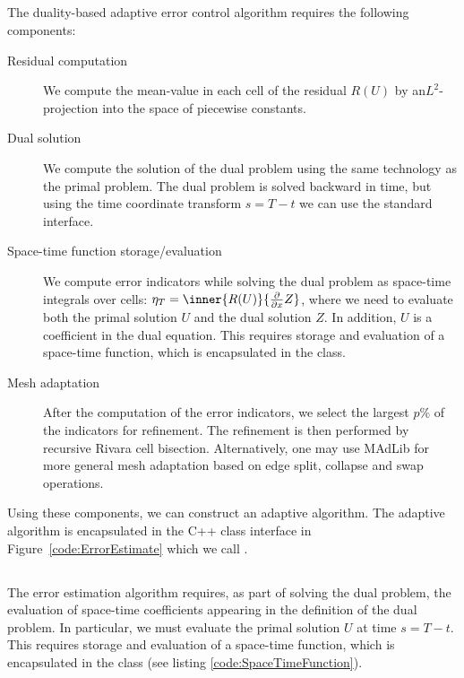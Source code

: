 \subsection{}

The duality-based adaptive error control algorithm requires the
following components:

\begin{description}
\item[Residual computation] We compute the mean-value in each cell of
  the residual $R(U)$ by an\break $L^2$-projection into the space of piecewise
  constants.
\item[Dual solution] We compute the solution of the dual problem using
  the same technology as the primal problem. The dual problem is
  solved backward in time, but using the time coordinate transform $s =
  T - t$ we can use the standard  interface.
\item[Space-time function storage/evaluation] We compute error
  indicators while solving the dual problem as space-time integrals
  over cells: $\eta_T = \inner{R(U)}{\frac{\partial}{\partial x} Z}$, where
  we need to evaluate both the primal solution $U$ and the dual
  solution $Z$. In addition, $U$ is a coefficient in the dual
  equation. This requires storage and evaluation of a space-time
  function, which is encapsulated in the 
  class.
\item[Mesh adaptation] After the computation of the error indicators,
  we select the largest $p\%$ of the indicators for refinement. The
  refinement is then performed by recursive Rivara cell bisection.
  Alternatively, one may use MAdLib
  \citep{Comp`ereRemacleJanssonEtAl2009} for more general mesh
  adaptation based on edge split, collapse and swap operations.
\end{description}

Using these components, we can construct an adaptive algorithm. The
adaptive algorithm is encapsulated in the C++ class interface in
Figure~\ref{code:ErrorEstimate} which we call .



\subsection{}

The error estimation algorithm requires, as part of solving the dual
problem, the evaluation of space-time coefficients appearing in the
definition of the dual problem. In particular, we must evaluate the
primal solution $U$ at time $s = T - t$.  This requires storage and
evaluation of a space-time function, which is encapsulated in the
 class (see listing
\ref{code:SpaceTimeFunction}).

